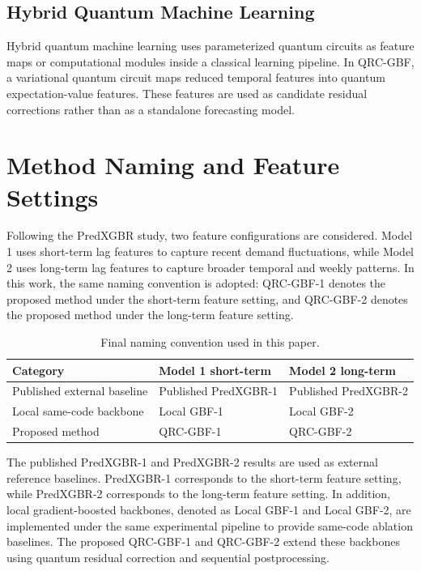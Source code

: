\documentclass[11pt]{article}
\begin{document}
\subsection{Hybrid Quantum Machine Learning}
Hybrid quantum machine learning uses parameterized quantum circuits as feature maps or computational modules inside a classical learning pipeline. In QRC-GBF, a variational quantum circuit maps reduced temporal features into quantum expectation-value features. These features are used as candidate residual corrections rather than as a standalone forecasting model.

\section{Method Naming and Feature Settings}
Following the PredXGBR study, two feature configurations are considered. Model 1 uses short-term lag features to capture recent demand fluctuations, while Model 2 uses long-term lag features to capture broader temporal and weekly patterns. In this work, the same naming convention is adopted: QRC-GBF-1 denotes the proposed method under the short-term feature setting, and QRC-GBF-2 denotes the proposed method under the long-term feature setting.

\begin{table}[H]
\centering
\caption{Final naming convention used in this paper.}
\begin{tabular}{lll}
\toprule
Category & Model 1 short-term & Model 2 long-term \\
\midrule
Published external baseline & Published PredXGBR-1 & Published PredXGBR-2 \\
Local same-code backbone & Local GBF-1 & Local GBF-2 \\
Proposed method & QRC-GBF-1 & QRC-GBF-2 \\
\bottomrule
\end{tabular}
\end{table}

The published PredXGBR-1 and PredXGBR-2 results are used as external reference baselines. PredXGBR-1 corresponds to the short-term feature setting, while PredXGBR-2 corresponds to the long-term feature setting. In addition, local gradient-boosted backbones, denoted as Local GBF-1 and Local GBF-2, are implemented under the same experimental pipeline to provide same-code ablation baselines. The proposed QRC-GBF-1 and QRC-GBF-2 extend these backbones using quantum residual correction and sequential postprocessing.
\end{document}
